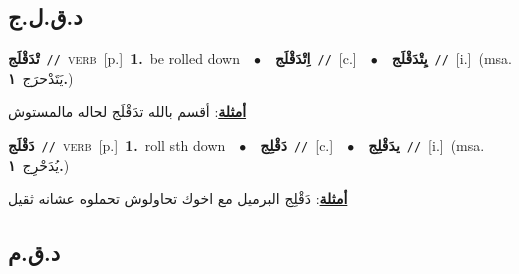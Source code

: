 \documentclass[10pt,a4paper,twoside]{article} %
\begin{document}
\begin{multicols}{2}
\vspace{-3mm}
\subsection*{\color{blue}\foreignlanguage{arabic}{د.ق.ل.ج}\color{blue}{}} 

{\setlength\topsep{0pt}\textbf{\foreignlanguage{arabic}{تْدَقْلَج}}\ {\color{gray}\texttt{//}\color{black}}\ \textsc{verb}\ [p.]\ \textbf{1.}~be rolled down\ \ $\bullet$\ \ \setlength\topsep{0pt}\textbf{\foreignlanguage{arabic}{اِتْدَقْلَج}}\ {\color{gray}\texttt{//}\color{black}}\ [c.]\ \ $\bullet$\ \ \setlength\topsep{0pt}\textbf{\foreignlanguage{arabic}{يِتْدَقْلَج}}\ {\color{gray}\texttt{//}\color{black}}\ [i.]\ \color{gray}(msa. \foreignlanguage{arabic}{يَتَدْحرَج}~\foreignlanguage{arabic}{\textbf{١.}})\color{black}\  \begin{flushright}\color{gray}\foreignlanguage{arabic}{\textbf{\underline{\foreignlanguage{arabic}{أمثلة}}}: أقسم بالله تدَقْلَج لحاله مالمستوش}\end{flushright}\color{black}} \vspace{2mm}

{\setlength\topsep{0pt}\textbf{\foreignlanguage{arabic}{دَقْلَج}}\ {\color{gray}\texttt{//}\color{black}}\ \textsc{verb}\ [p.]\ \textbf{1.}~roll sth down\ \ $\bullet$\ \ \setlength\topsep{0pt}\textbf{\foreignlanguage{arabic}{دَقْلِج}}\ {\color{gray}\texttt{//}\color{black}}\ [c.]\ \ $\bullet$\ \ \setlength\topsep{0pt}\textbf{\foreignlanguage{arabic}{يدَقْلِج}}\ {\color{gray}\texttt{//}\color{black}}\ [i.]\ \color{gray}(msa. \foreignlanguage{arabic}{يُدَحْرِج}~\foreignlanguage{arabic}{\textbf{١.}})\color{black}\  \begin{flushright}\color{gray}\foreignlanguage{arabic}{\textbf{\underline{\foreignlanguage{arabic}{أمثلة}}}: دَقْلِج البرميل مع اخوك تحاولوش تحملوه عشانه ثقيل}\end{flushright}\color{black}} \vspace{2mm}

\vspace{-3mm}
\subsection*{\color{blue}\foreignlanguage{arabic}{د.ق.م}\color{blue}{}} 


\end{multicols}
\end{document}
